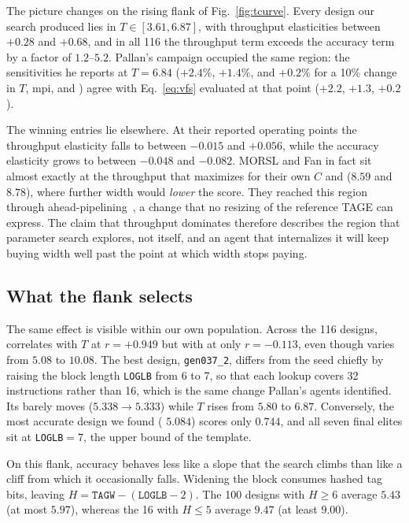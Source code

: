 \documentclass[conference]{IEEEtran}
\newcommand{\vfs}{\text{VFS}}
\newcommand{\mpki}{\text{MPKI}}
\newcommand{\epi}{\text{EPI}}
\begin{document}
The picture changes on the rising flank of Fig.~\ref{fig:tcurve}. Every design
our search produced lies in $T\in[3.61,6.87]$, with throughput elasticities
between $+0.28$ and $+0.68$, and in all 116 the throughput term exceeds the
accuracy term by a factor of $1.2$--$5.2$. Pallan's campaign occupied the same
region: the sensitivities he reports at $T=6.84$ ($+2.4\%$, $+1.4\%$, and
$+0.2\%$ \vfs{} for a 10\% change in $T$, mpi, and \epi{}) agree with
Eq.~\eqref{eq:vfs} evaluated at that point ($+2.2$, $+1.3$, $+0.2$).

The winning entries lie elsewhere. At their reported operating points the
throughput elasticity falls to between $-0.015$ and $+0.056$, while the accuracy
elasticity grows to between $-0.048$ and $-0.082$. MORSL and Fan in fact sit
almost exactly at the throughput that maximizes \vfs{} for their own $C$ and
\epi{} ($8.59$ and $8.78$), where further width would \emph{lower} the score.
They reached this region through ahead-pipelining~\cite{koizumi,fan,dang}, a
change that no resizing of the reference TAGE can express. The claim that
throughput dominates therefore describes the region that parameter search
explores, not \vfs{} itself, and an agent that internalizes it will keep buying
width well past the point at which width stops paying.

\subsection{What the flank selects}

The same effect is visible within our own population. Across the 116 designs,
\vfs{} correlates with $T$ at $r=+0.949$ but with \mpki{} at only $r=-0.113$,
even though \mpki{} varies from $5.08$ to $10.08$. The best design,
\texttt{gen037\_2}, differs from the seed chiefly by raising the block length
\texttt{LOGLB} from 6 to 7, so that each lookup covers 32 instructions rather
than 16, which is the same change Pallan's agents identified. Its \mpki{} barely
moves ($5.338\to5.333$) while $T$ rises from $5.80$ to $6.87$. Conversely, the
most accurate design we found (\mpki{} $5.084$) scores only $0.744$, and all
seven final elites sit at \texttt{LOGLB}$=7$, the upper bound of the template.

On this flank, accuracy behaves less like a slope that the search climbs than
like a cliff from which it occasionally falls. Widening the block consumes
hashed tag bits, leaving $H=\texttt{TAGW}-(\texttt{LOGLB}-2)$. The 100 designs
with $H\ge6$ average $5.43$ \mpki{} (at most $5.97$), whereas the 16 with $H\le5$
average $9.47$ (at least $9.00$).
\end{document}
